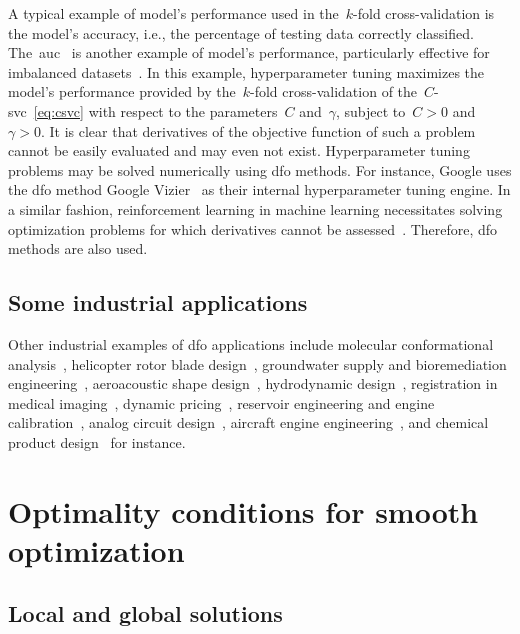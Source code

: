A typical example of model's performance used in the~$k$-fold cross-validation is the model's accuracy, i.e., the percentage of testing data correctly classified.
The~\gls{auc}~\cite{Hanley_Mcneil_1982} is another example of model's performance, particularly effective for imbalanced datasets~\cite{Bradley_1997}.
In this example, hyperparameter tuning maximizes the model's performance provided by the~$k$-fold cross-validation of the~$C$-\gls{svc}~\cref{eq:csvc} with respect to the parameters~$C$ and~$\gamma$, subject to~$C > 0$ and~$\gamma > 0$.
It is clear that derivatives of the objective function of such a problem cannot be easily evaluated and may even not exist.
Hyperparameter tuning problems may be solved numerically using \gls{dfo} methods.
For instance, Google uses the \gls{dfo} method Google Vizier~\cite{Golovin_Etal_2017} as their internal hyperparameter tuning engine.
In a similar fashion, reinforcement learning in machine learning necessitates solving optimization problems for which derivatives cannot be assessed~\cite{Qian_Yu_2021}.
Therefore, \gls{dfo} methods are also used.

\subsection{Some industrial applications}

Other industrial examples of \gls{dfo} applications include molecular conformational analysis~\cite{Alberto_Etal_2004,Meza_Martinez_1994}, helicopter rotor blade design~\cite{Booker_Etal_1998a,Booker_Etal_1998b,Serafini_1998}, groundwater supply and bioremediation engineering~\cite{Fowler_Etal_2008,Mugunthan_Shoemaker_Regis_2005,Yoon_Shoemaker_1999}, aeroacoustic shape design~\cite{Marsden_2004,Marsden_Etal_2004}, hydrodynamic design~\cite{Duvigneau_Visonneau_2004}, registration in medical imaging~\cite{Oeuvray_2005,Oeuvray_Bierlaire_2007}, dynamic pricing~\cite{Levina_Etal_2009}, reservoir engineering and engine calibration~\cite{Langouet_2011}, analog circuit design~\cite{Latorre_Etal_2019}, aircraft engine engineering~\cite{Gazaix_Etal_2019}, and chemical product design~\cite{Sun_Etal_2020} for instance.

\section{Optimality conditions for smooth optimization}

\subsection{Local and global solutions}

